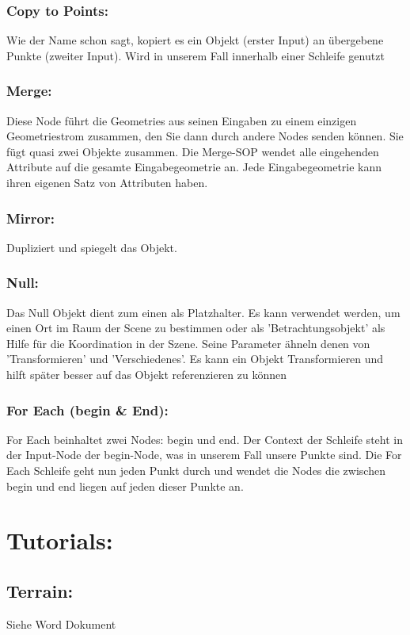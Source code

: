 \documentclass[paper=a4,fontsize=12pt,ngerman]{scrartcl}
\begin{document}
	\subsubsection*{Copy to Points:}
	Wie der Name schon sagt, kopiert es ein Objekt (erster Input) an übergebene Punkte (zweiter Input). Wird in unserem Fall innerhalb einer Schleife genutzt
	\subsubsection*{Merge:}
	Diese Node führt die Geometries aus seinen Eingaben zu einem einzigen Geometriestrom zusammen, den Sie dann durch andere Nodes senden können. Sie fügt quasi zwei Objekte zusammen. Die Merge-SOP wendet alle eingehenden Attribute auf die gesamte Eingabegeometrie an. Jede Eingabegeometrie kann ihren eigenen Satz von Attributen haben.
	\subsubsection*{Mirror:}
	Dupliziert und spiegelt das Objekt. 
	\subsubsection*{Null:}
	Das Null Objekt dient zum einen als Platzhalter. Es kann verwendet werden, um einen Ort im Raum der Scene zu bestimmen oder als 'Betrachtungsobjekt' als Hilfe für die Koordination in der Szene. Seine Parameter ähneln denen von 'Transformieren' und 'Verschiedenes'. Es kann ein Objekt Transformieren und hilft später besser auf das Objekt referenzieren zu können
	\subsubsection*{For Each (begin \& End):}
	For Each beinhaltet zwei Nodes: begin und end. Der Context der Schleife steht in der Input-Node der begin-Node, was in unserem Fall unsere Punkte sind. Die For Each Schleife geht nun jeden Punkt durch und wendet die Nodes die zwischen begin und end liegen auf jeden dieser Punkte an.
	
	\section*{\textcolor{rosa}{Tutorials:}}
	\subsection*{Terrain:}
	 Siehe Word Dokument
	
\end{document}
